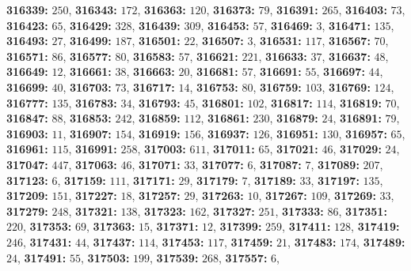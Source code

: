 \textsf{\bfseries 316339:} $250$, \textsf{\bfseries 316343:} $172$, \textsf{\bfseries 316363:} $120$, \textsf{\bfseries 316373:} $79$, \textsf{\bfseries 316391:} $265$, \textsf{\bfseries 316403:} $73$, \textsf{\bfseries 316423:} $65$, \textsf{\bfseries 316429:} $328$, \textsf{\bfseries 316439:} $309$, \textsf{\bfseries 316453:} $57$, \textsf{\bfseries 316469:} $3$, \textsf{\bfseries 316471:} $135$, \textsf{\bfseries 316493:} $27$, \textsf{\bfseries 316499:} $187$, \textsf{\bfseries 316501:} $22$, \textsf{\bfseries 316507:} $3$, \textsf{\bfseries 316531:} $117$, \textsf{\bfseries 316567:} $70$, \textsf{\bfseries 316571:} $86$, \textsf{\bfseries 316577:} $80$, \textsf{\bfseries 316583:} $57$, \textsf{\bfseries 316621:} $221$, \textsf{\bfseries 316633:} $37$, \textsf{\bfseries 316637:} $48$, \textsf{\bfseries 316649:} $12$, \textsf{\bfseries 316661:} $38$, \textsf{\bfseries 316663:} $20$, \textsf{\bfseries 316681:} $57$, \textsf{\bfseries 316691:} $55$, \textsf{\bfseries 316697:} $44$, \textsf{\bfseries 316699:} $40$, \textsf{\bfseries 316703:} $73$, \textsf{\bfseries 316717:} $14$, \textsf{\bfseries 316753:} $80$, \textsf{\bfseries 316759:} $103$, \textsf{\bfseries 316769:} $124$, \textsf{\bfseries 316777:} $135$, \textsf{\bfseries 316783:} $34$, \textsf{\bfseries 316793:} $45$, \textsf{\bfseries 316801:} $102$, \textsf{\bfseries 316817:} $114$, \textsf{\bfseries 316819:} $70$, \textsf{\bfseries 316847:} $88$, \textsf{\bfseries 316853:} $242$, \textsf{\bfseries 316859:} $112$, \textsf{\bfseries 316861:} $230$, \textsf{\bfseries 316879:} $24$, \textsf{\bfseries 316891:} $79$, \textsf{\bfseries 316903:} $11$, \textsf{\bfseries 316907:} $154$, \textsf{\bfseries 316919:} $156$, \textsf{\bfseries 316937:} $126$, \textsf{\bfseries 316951:} $130$, \textsf{\bfseries 316957:} $65$, \textsf{\bfseries 316961:} $115$, \textsf{\bfseries 316991:} $258$, \textsf{\bfseries 317003:} $611$, \textsf{\bfseries 317011:} $65$, \textsf{\bfseries 317021:} $46$, \textsf{\bfseries 317029:} $24$, \textsf{\bfseries 317047:} $447$, \textsf{\bfseries 317063:} $46$, \textsf{\bfseries 317071:} $33$, \textsf{\bfseries 317077:} $6$, \textsf{\bfseries 317087:} $7$, \textsf{\bfseries 317089:} $207$, \textsf{\bfseries 317123:} $6$, \textsf{\bfseries 317159:} $111$, \textsf{\bfseries 317171:} $29$, \textsf{\bfseries 317179:} $7$, \textsf{\bfseries 317189:} $33$, \textsf{\bfseries 317197:} $135$, \textsf{\bfseries 317209:} $151$, \textsf{\bfseries 317227:} $18$, \textsf{\bfseries 317257:} $29$, \textsf{\bfseries 317263:} $10$, \textsf{\bfseries 317267:} $109$, \textsf{\bfseries 317269:} $33$, \textsf{\bfseries 317279:} $248$, \textsf{\bfseries 317321:} $138$, \textsf{\bfseries 317323:} $162$, \textsf{\bfseries 317327:} $251$, \textsf{\bfseries 317333:} $86$, \textsf{\bfseries 317351:} $220$, \textsf{\bfseries 317353:} $69$, \textsf{\bfseries 317363:} $15$, \textsf{\bfseries 317371:} $12$, \textsf{\bfseries 317399:} $259$, \textsf{\bfseries 317411:} $128$, \textsf{\bfseries 317419:} $246$, \textsf{\bfseries 317431:} $44$, \textsf{\bfseries 317437:} $114$, \textsf{\bfseries 317453:} $117$, \textsf{\bfseries 317459:} $21$, \textsf{\bfseries 317483:} $174$, \textsf{\bfseries 317489:} $24$, \textsf{\bfseries 317491:} $55$, \textsf{\bfseries 317503:} $199$, \textsf{\bfseries 317539:} $268$, \textsf{\bfseries 317557:} $6$, 

